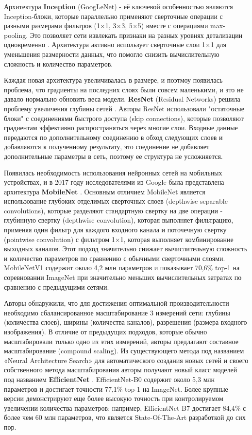 \documentclass[14pt]{extarticle}
\begin{document}
Архитектура \textbf{Inception} (GoogLeNet) - её ключевой особенностью являются Inception-блоки, которые параллельно применяют сверточные операции с разными размерами фильтров (1×1, 3×3, 5×5) вместе с операциями max-pooling. Это позволяет сети извлекать признаки на разных уровнях детализации одновременно \cite{szegedy2014going}. Архитектура активно использует сверточные слои 1×1 для уменьшения размерности данных, что помогло снизить вычислительную сложность и количество параметров.

Каждая новая архитектура увеличивалась в размере, и поэтмоу появилась проблема, что градиенты на последних слоях были совсем маленькими, и это не давало нормально обновить веса модели. \textbf{ResNet} (Residual Networks) решила проблему увеличения глубины сетей \cite{he2015deep}. Авторы ResNet использовали "остаточные блоки" с соединениями быстрого доступа (skip connections), которые позволяют градиентам эффективно распространяться через многие слои. Входные данные передаются по дополнительному соединению в обход следующих слоев и добавляются к полученному результату, это соединение не добавляет дополнительные параметры в сеть, поэтому ее структура не усложняется.

Появилась необходимость использования нейронных сетей на мобильных устройствах, и в 2017 году исследователями из Google была представлена архитектура  \textbf{MobileNet} \cite{howard2017mobilenets}. Основным отличием  MobileNet является использование глубоких отделимых сверточных слоев (depthwise separable convolutions), которые разделяют стандартную свертку на две операции - глубинную свертку (depthwise convolution), которая выполняет фильтрацию, применяя один фильтр для каждого входного канала и поточечную свертку (pointwise convolution) с фильтром 1×1, которая выполняет комбинирование выходных каналов. Этот подход значительно снижает вычислительную сложность и количество параметров по сравнению с обычными сверточными слоями. MobileNetV1 содержит около 4,2 млн параметров и показывает 70,6\% top-1 на соревновании ImageNet при значительно меньших вычислительных затратах по сравнению с предыдущими сетями.

Авторы обнаружили, что для достижения оптимальной производительности необходимо сбалансированное масштабирование 3 измерений сети: глубины (количества слоев), ширины (количества каналов), разрешения (размера входного изображения). В отличие от предыдущих подходов, которые обычно масштабировали только одно из этих измерений, авторы предлагают составное масштабирование (compound scaling). Из существующего метода под названием «Neural Architecture Search» \cite{zoph2017neural} для автоматического создания новых сетей и своего собственного метода масштабирования авторы получают новый класс моделей под названием  \textbf{EfficientNet} \cite{tan2019efficientnet}. EfficientNet-B0 содержит около 5,3 млн параметров и достигает точности 77,1\% top-1 на ImageNet. Более крупные версии демонстрируют еще более высокую точность при контролируемом увеличении количества параметров: например, EfficientNet-B7 достигает 84,4\% с более чем 60 млн параметров, что является State-Of-The-Art разработкой до сих пор. 
\end{document}
